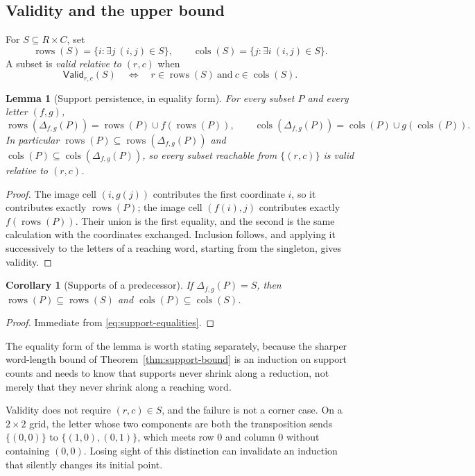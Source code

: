 \documentclass[11pt,letterpaper]{article}
\numberwithin{equation}{section}
\newtheorem{lemma}[theorem]{Lemma}
\newtheorem{corollary}[theorem]{Corollary}
\theoremstyle{definition}
\theoremstyle{remark}
\newcommand{\suppR}{\operatorname{rows}}
\newcommand{\suppC}{\operatorname{cols}}
\newcommand{\Valid}{\mathsf{Valid}}
\begin{document}
\subsection{Validity and the upper bound}
For $S\subseteq R\times C$, set
\[
 \suppR(S)=\{i:\exists j\ (i,j)\in S\},\qquad
 \suppC(S)=\{j:\exists i\ (i,j)\in S\}.
\]
A subset is \emph{valid relative to $(r,c)$} when
\[
 \Valid_{r,c}(S)\quad\Longleftrightarrow\quad
 r\in\suppR(S)\ \text{and}\ c\in\suppC(S).
\]
\begin{lemma}[Support persistence, in equality form]\label{lem:persistence}
For every subset $P$ and every letter $(f,g)$,
\begin{equation}\label{eq:support-equalities}
 \suppR(\Delta_{f,g}(P))=\suppR(P)\cup f(\suppR(P)),\qquad
 \suppC(\Delta_{f,g}(P))=\suppC(P)\cup g(\suppC(P)).
\end{equation}
In particular
$\suppR(P)\subseteq\suppR(\Delta_{f,g}(P))$ and
$\suppC(P)\subseteq\suppC(\Delta_{f,g}(P))$, so every subset reachable from
$\{(r,c)\}$ is valid relative to $(r,c)$.
\end{lemma}
\begin{proof}
The image cell $(i,g(j))$ contributes the first coordinate $i$, so it
contributes exactly $\suppR(P)$; the image cell $(f(i),j)$ contributes exactly
$f(\suppR(P))$. Their union is the first equality, and the second is the same
calculation with the coordinates exchanged. Inclusion follows, and applying it
successively to the letters of a reaching word, starting from the singleton,
gives validity.
\end{proof}

\begin{corollary}[Supports of a predecessor]\label{cor:pred-support}
If $\Delta_{f,g}(P)=S$, then $\suppR(P)\subseteq\suppR(S)$ and
$\suppC(P)\subseteq\suppC(S)$.
\end{corollary}
\begin{proof}
Immediate from \eqref{eq:support-equalities}.
\end{proof}

The equality form of the lemma is worth stating separately, because the
sharper word-length bound of Theorem~\ref{thm:support-bound} is an induction
on support counts and needs to know that supports never shrink along a
reduction, not merely that they never shrink along a reaching word.

Validity does not require $(r,c)\in S$, and the failure is not a corner case.
On a $2\times2$ grid, the letter whose two components are both the
transposition sends $\{(0,0)\}$ to $\{(1,0),(0,1)\}$, which meets row $0$ and
column $0$ without containing $(0,0)$. Losing sight of this distinction can
invalidate an induction that silently changes its initial point.
\end{document}
